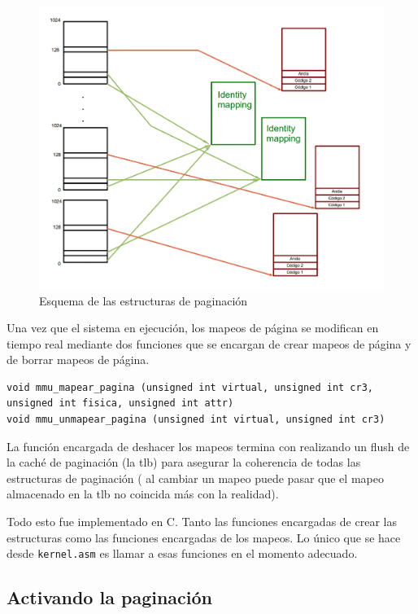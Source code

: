 \begin{figure}[h]
\begin{center}
  \includegraphics[scale=0.3]{secciones/dibujitos/diagramapaginas.jpg}
\end{center}
\caption{Esquema de las estructuras de paginación}
\label{fig:diagramapaginas}
\end{figure}


	Una vez que el sistema en ejecución, los mapeos de página se modifican
en tiempo real mediante dos funciones que se encargan de crear
mapeos de página y de borrar mapeos de página.

\begin{verbatim}
void mmu_mapear_pagina (unsigned int virtual, unsigned int cr3, unsigned int fisica, unsigned int attr) 
void mmu_unmapear_pagina (unsigned int virtual, unsigned int cr3) 
\end{verbatim}


	La función encargada de deshacer los mapeos termina con realizando un flush
de la caché de paginación (la tlb) para asegurar la coherencia de todas las estructuras de paginación (
al cambiar un mapeo puede pasar que el mapeo almacenado en la tlb no coincida
más con la realidad).

	Todo esto fue implementado en C. Tanto las funciones
encargadas de crear las estructuras como las funciones encargadas
de los mapeos. Lo único que se hace desde \texttt{kernel.asm} es
llamar a esas funciones en el momento adecuado.

\subsection{Activando la paginación}

